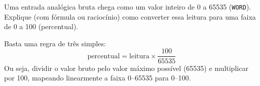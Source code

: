 \question[4] Uma entrada analógica bruta chega como um valor inteiro de 0 a 65535 (\texttt{WORD}). Explique (com fórmula ou raciocínio) como converter essa leitura para uma faixa de 0 a 100 (percentual).

\begin{solution}
Basta uma regra de três simples:
\[
\text{percentual} = \text{leitura} \times \dfrac{100}{65535}
\]
Ou seja, dividir o valor bruto pelo valor máximo possível (65535) e multiplicar por 100, mapeando linearmente a faixa 0--65535 para 0--100.
\end{solution}
